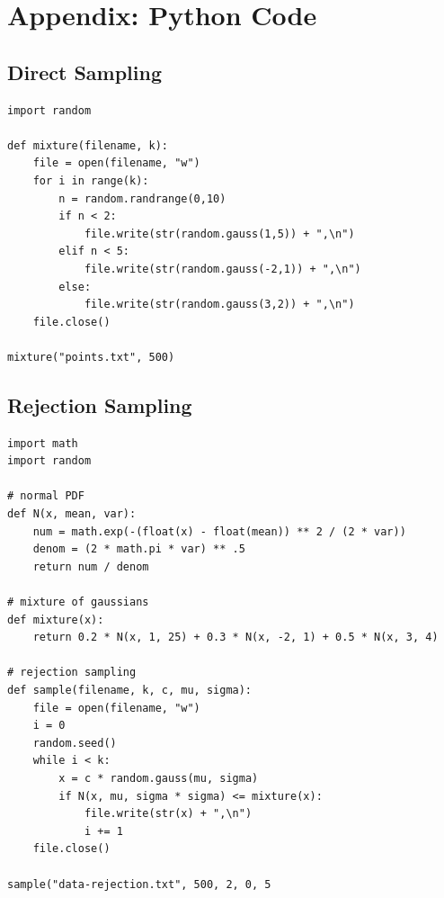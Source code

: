 \documentclass{article}
\begin{document}
    \newpage
    \section*{Appendix: Python Code}
        \subsection*{Direct Sampling}
        \begin{verbatim}
import random

def mixture(filename, k):
    file = open(filename, "w")
    for i in range(k):
        n = random.randrange(0,10)
        if n < 2:
            file.write(str(random.gauss(1,5)) + ",\n")
        elif n < 5:
            file.write(str(random.gauss(-2,1)) + ",\n")
        else:
            file.write(str(random.gauss(3,2)) + ",\n")
    file.close()
    
mixture("points.txt", 500)
        \end{verbatim}
        
        \subsection*{Rejection Sampling}
        \begin{verbatim}
import math
import random

# normal PDF
def N(x, mean, var):
    num = math.exp(-(float(x) - float(mean)) ** 2 / (2 * var))
    denom = (2 * math.pi * var) ** .5
    return num / denom

# mixture of gaussians
def mixture(x):
    return 0.2 * N(x, 1, 25) + 0.3 * N(x, -2, 1) + 0.5 * N(x, 3, 4)

# rejection sampling
def sample(filename, k, c, mu, sigma):
    file = open(filename, "w")
    i = 0
    random.seed()
    while i < k:
        x = c * random.gauss(mu, sigma)
        if N(x, mu, sigma * sigma) <= mixture(x):
            file.write(str(x) + ",\n")
            i += 1
    file.close()

sample("data-rejection.txt", 500, 2, 0, 5
        \end{verbatim}
        
        \newpage
\end{document}
